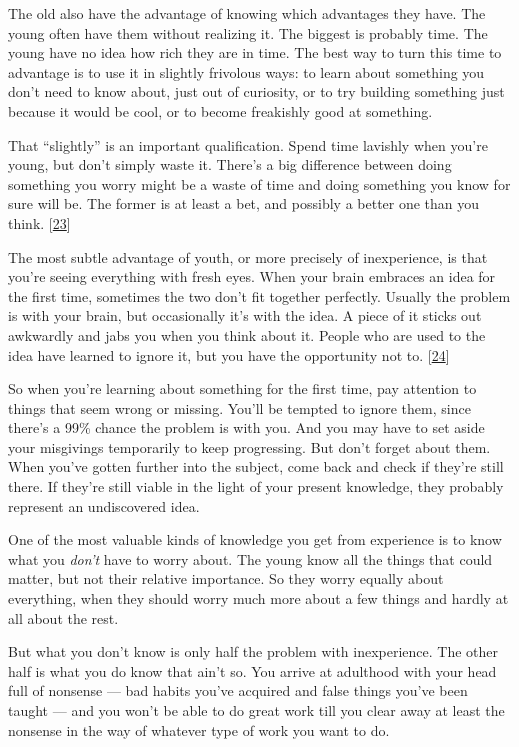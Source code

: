 The old also have the advantage of knowing which advantages they have.
The young often have them without realizing it. The biggest is probably
time. The young have no idea how rich they are in time. The best way to
turn this time to advantage is to use it in slightly frivolous ways: to
learn about something you don't need to know about, just out of
curiosity, or to try building something just because it would be cool,
or to become freakishly good at something.

That ``slightly'' is an important qualification. Spend time lavishly
when you're young, but don't simply waste it. There's a big difference
between doing something you worry might be a waste of time and doing
something you know for sure will be. The former is at least a bet, and
possibly a better one than you think. {[}\hyperref[f23n]{23}{]}

The most subtle advantage of youth, or more precisely of inexperience,
is that you're seeing everything with fresh eyes. When your brain
embraces an idea for the first time, sometimes the two don't fit
together perfectly. Usually the problem is with your brain, but
occasionally it's with the idea. A piece of it sticks out awkwardly and
jabs you when you think about it. People who are used to the idea have
learned to ignore it, but you have the opportunity not to.
{[}\hyperref[f24n]{24}{]}

So when you're learning about something for the first time, pay
attention to things that seem wrong or missing. You'll be tempted to
ignore them, since there's a 99\% chance the problem is with you. And
you may have to set aside your misgivings temporarily to keep
progressing. But don't forget about them. When you've gotten further
into the subject, come back and check if they're still there. If they're
still viable in the light of your present knowledge, they probably
represent an undiscovered idea.

One of the most valuable kinds of knowledge you get from experience is
to know what you \emph{don't} have to worry about. The young know all
the things that could matter, but not their relative importance. So they
worry equally about everything, when they should worry much more about a
few things and hardly at all about the rest.

But what you don't know is only half the problem with inexperience. The
other half is what you do know that ain't so. You arrive at adulthood
with your head full of nonsense --- bad habits you've acquired and false
things you've been taught --- and you won't be able to do great work
till you clear away at least the nonsense in the way of whatever type of
work you want to do.

